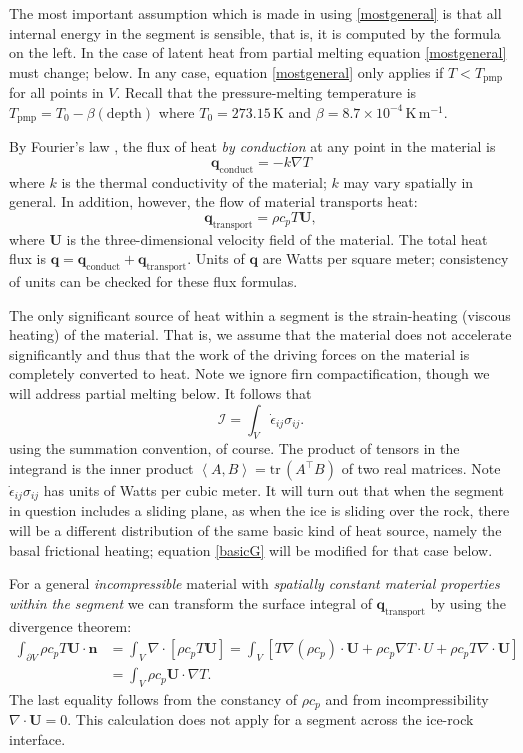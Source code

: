 \documentclass[12pt,final]{amsart}%
\theoremstyle{plain}
\theoremstyle{definition}
\theoremstyle{remark}
\newcommand{\diverg}{\nabla\cdot}
\newcommand{\Div}{\diverg}
\def\eps{\epsilon}
\newcommand{\grad}{\nabla}
\newcommand{\ip}[2]{\ensuremath{\left<#1,#2\right>}}
\newcommand{\nhat}{\mathbf{n}}
\def\tr{\mathrm{tr}\,}
\newcommand{\Tpmp}{T_{\text{pmp}}}
\newcommand{\bq}{{\mathbf{q}}}
\newcommand{\bU}{{\mathbf{U}}}
\begin{document}
The most important assumption which is made in using \eqref{mostgeneral} is that all internal energy in the segment is sensible, that is, it is computed by the formula on the left.  In the case of latent heat from partial melting equation \eqref{mostgeneral} must change; below.  In any case, equation \eqref{mostgeneral} only applies if $T < \Tpmp$ for all points in $V$.  Recall that the pressure-melting temperature is $\Tpmp = T_0 - \beta (\text{depth})$ where $T_0=273.15\,\text{K}$ and $\beta = 8.7 \times 10^{-4}\,\text{K}\,\text{m}^{-1}$.

By Fourier's law \citep{Fowler}, the flux of heat \emph{by conduction} at any point in the material is
    $$\bq_{\text{conduct}} = - k \grad T$$
where $k$ is the thermal conductivity of the material; $k$ may vary spatially in general.  In addition, however, the flow of material transports heat:
    $$\bq_{\text{transport}} = \rho c_p T \bU,$$
where $\bU$ is the three-dimensional velocity field of the material.  The total heat flux is $\bq = \bq_{\text{conduct}} + \bq_{\text{transport}}$.  Units of $\bq$ are Watts per square meter; consistency of units can be checked for these flux formulas.

The only significant source of heat within a segment is the strain-heating (viscous heating) of the material.  That is, we assume that the material does not accelerate significantly and thus that the work of the driving forces on the material is completely converted to heat.  Note we ignore firn compactification, though we will address partial melting below.  It follows that \citep[see][]{Paterson}
\begin{equation}\label{basicG}
\mathcal{I} = \int_V \dot\eps_{ij} \sigma_{ij}.
\end{equation}
using the summation convention, of course.  The product of tensors in the integrand is the inner product $\ip{A}{B}=\tr(A^\top B)$ of two real matrices.  Note $\dot\eps_{ij} \sigma_{ij}$ has units of Watts per cubic meter.  It will turn out that when the segment in question includes a sliding plane, as when the ice is sliding over the rock, there will be a different distribution of the same basic kind of heat source, namely the basal frictional heating; equation \eqref{basicG} will be modified for that case below.

For a general \emph{incompressible} material with \emph{spatially constant material properties within the segment} we can transform the surface integral of $\bq_{\text{transport}}$ by using the divergence theorem:
\begin{align*}
\int_{\partial V} \rho c_p T \bU \cdot \nhat &= \int_V \Div\left[\rho c_p T \bU\right] = \int_V \left[T \grad(\rho c_p) \cdot \bU + \rho c_p \grad T \cdot U + \rho c_p T \Div \bU\right] \\
    &= \int_V \rho c_p \bU \cdot \grad T.
\end{align*}
The last equality follows from the constancy of $\rho c_p$ and from incompressibility $\Div \bU = 0$.  This calculation does not apply for a segment across the ice-rock interface.
\end{document}
